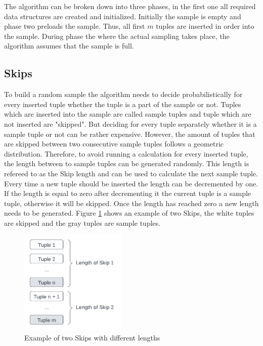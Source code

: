 \documentclass[sigconf,nonacm]{acmart}
\begin{document}
        The algorithm can be broken down into three phases, in the first one all required data structures are created and initialized. Initially the sample is empty and phase two preloads the sample. Thus, all first $m$ tuples are inserted in order into the sample. During phase the where the actual sampling takes place, the algorithm assumes that the sample is full.
        
    \subsection{Skips}
        To build a random sample the algorithm needs to decide probabilistically for every inserted tuple whether the tuple is a part of the sample or not. Tuples which are inserted into the sample are called sample tuples and tuple which are not inserted are "skipped". But deciding for every tuple separately whether it is a sample tuple or not can be rather expensive. However, the amount of tuples that are skipped between two consecutive sample tuples follows a geometric distribution. Therefore, to avoid running a calculation for every inserted tuple, the length between to sample tuples can be generated randomly. This length is refereed to as the Skip length and can be used to calculate the next sample tuple. Every time a new tuple should be inserted the length can be decremented by one. If the length is equal to zero after decrementing it the current tuple is a sample tuple, otherwise it will be skipped. Once the length has reached zero a new length needs to be generated. Figure \ref{fig:skips} shows an example of two Skips, 
        the white tuples are skipped and the gray tuples are sample tuples.
        \begin{figure}[h]
            \centering
            \includegraphics[height=5cm]{figure1.pdf}
            \caption{Example of two Skips with different lengths}
            \label{fig:skips}
        \end{figure}
\end{document}
